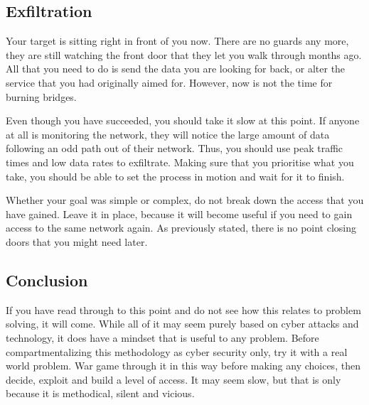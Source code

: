 		\subsection{Exfiltration}
			Your target is sitting right in front of you now. 
			There are no guards any more, they are still watching the front door that they let you walk through months ago. 
			All that you need to do is send the data you are looking for back, or alter the service that you had originally aimed for. 
			However, now is not the time for burning bridges. 

			Even though you have succeeded, you should take it slow at this point. 
			If anyone at all is monitoring the network, they will notice the large amount of data following an odd path out of their network. 
			Thus, you should use peak traffic times and low data rates to exfiltrate. 
			Making sure that you prioritise what you take, you should be able to set the process in motion and wait for it to finish. 

			Whether your goal was simple or complex, do not break down the access that you have gained. 
			Leave it in place, because it will become useful if you need to gain access to the same network again. 
			As previously stated, there is no point closing doors that you might need later. 

		\subsection{Conclusion}
			If you have read through to this point and do not see how this relates to problem solving, it will come. 
			While all of it may seem purely based on cyber attacks and technology, it does have a mindset that is useful to any problem. 
			Before compartmentalizing this methodology as cyber security only, try it with a real world problem. 
			War game through it in this way before making any choices, then decide, exploit and build a level of access. 
			It may seem slow, but that is only because it is methodical, silent and vicious. 


